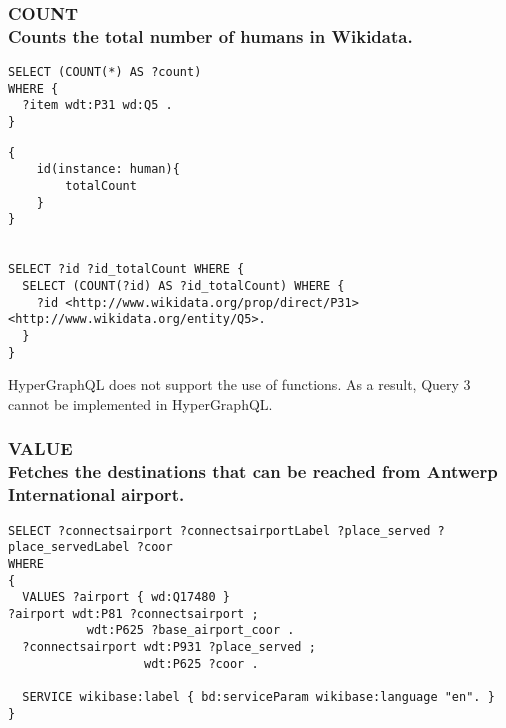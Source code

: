 \subsubsection{COUNT \\Counts the total number of humans in Wikidata.}

\begin{minipage}{\linewidth}
\begin{lstlisting}[label=listing:listing40, caption={Query 3}]
SELECT (COUNT(*) AS ?count)
WHERE {
  ?item wdt:P31 wd:Q5 .
}
\end{lstlisting}
\end{minipage}


\begin{minipage}{\linewidth}
\begin{lstlisting}[label=listing:listing41, caption={Query 3 - GraphQL-LD}]
{
    id(instance: human){
        totalCount
    }
}


SELECT ?id ?id_totalCount WHERE { 
  SELECT (COUNT(?id) AS ?id_totalCount) WHERE { 
    ?id <http://www.wikidata.org/prop/direct/P31> <http://www.wikidata.org/entity/Q5>. 
  } 
}
\end{lstlisting}
\end{minipage}


HyperGraphQL does not support the use of functions. As a result, Query 3 cannot be implemented in HyperGraphQL.



\subsubsection{VALUE \\Fetches the destinations that can be reached from Antwerp International airport.}

\begin{minipage}{\linewidth}
\begin{lstlisting}[label=listing:listing43, caption={Query 4}]
SELECT ?connectsairport ?connectsairportLabel ?place_served ?place_servedLabel ?coor
WHERE
{
  VALUES ?airport { wd:Q17480 }  
?airport wdt:P81 ?connectsairport ;
           wdt:P625 ?base_airport_coor .
  ?connectsairport wdt:P931 ?place_served ;
                   wdt:P625 ?coor .

  SERVICE wikibase:label { bd:serviceParam wikibase:language "en". }
}
\end{lstlisting}
\end{minipage}

